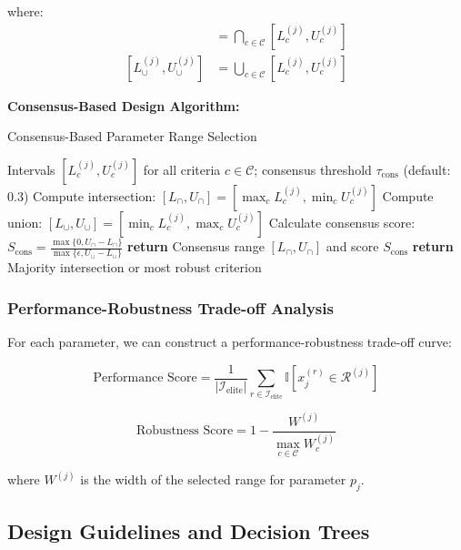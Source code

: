 \documentclass[12pt,a4paper]{article}
\begin{document}
where:
\begin{align}
[L_{\cap}^{(j)}, U_{\cap}^{(j)}] &= \bigcap_{c \in \mathcal{C}} [L_c^{(j)}, U_c^{(j)}] \\
[L_{\cup}^{(j)}, U_{\cup}^{(j)}] &= \bigcup_{c \in \mathcal{C}} [L_c^{(j)}, U_c^{(j)}]
\end{align}

\textbf{Consensus-Based Design Algorithm:}
\begin{algorithm}[H]
\caption{Consensus-Based Parameter Range Selection}
\begin{algorithmic}[1]
\REQUIRE Intervals $[L_c^{(j)}, U_c^{(j)}]$ for all criteria $c \in \mathcal{C}$; consensus threshold $\tau_{\text{cons}}$ (default: 0.3)
\STATE Compute intersection: $[L_{\cap}, U_{\cap}] = [\max_c L_c^{(j)}, \min_c U_c^{(j)}]$
\STATE Compute union: $[L_{\cup}, U_{\cup}] = [\min_c L_c^{(j)}, \max_c U_c^{(j)}]$
\STATE Calculate consensus score: $S_{\text{cons}} = \frac{\max\{0, U_{\cap} - L_{\cap}\}}{\max\{\epsilon, U_{\cup} - L_{\cup}\}}$
    \STATE \textbf{return} Consensus range $[L_{\cap}, U_{\cap}]$ and score $S_{\text{cons}}$
\ELSE
    \STATE \textbf{return} Majority intersection or most robust criterion
\ENDIF
\end{algorithmic}
\end{algorithm}

\subsubsection{Performance-Robustness Trade-off Analysis}

For each parameter, we can construct a performance-robustness trade-off curve:

\begin{equation}
\text{Performance Score} = \frac{1}{|\mathcal{I}_{\text{elite}}|} \sum_{r \in \mathcal{I}_{\text{elite}}} \mathbb{I}[x_j^{(r)} \in \mathcal{R}^{(j)}]
\end{equation}

\begin{equation}
\text{Robustness Score} = 1 - \frac{W^{(j)}}{\max_{c \in \mathcal{C}} W_c^{(j)}}
\end{equation}

where $W^{(j)}$ is the width of the selected range for parameter $p_j$.

\subsection{Design Guidelines and Decision Trees}
\end{document}
